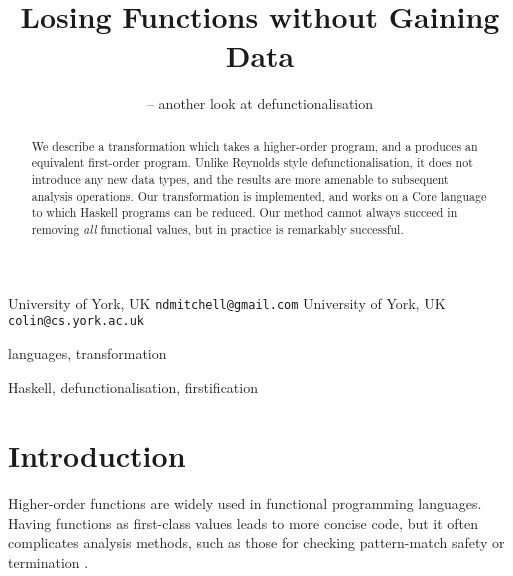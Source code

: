 \documentclass[preprint]{sigplanconf}
\begin{document}
\copyrightdata{[to be supplied]}

\titlebanner{} %
\preprintfooter{}   %

\title{Losing Functions without Gaining Data}
\subtitle{ -- another look at defunctionalisation}

           {University of York, UK}
           {\verb"ndmitchell@gmail.com"}
           {University of York, UK}
           {\verb"colin@cs.york.ac.uk"}

\maketitle

\begin{abstract}
We describe a transformation which takes a higher-order program, and a produces an equivalent first-order program. Unlike Reynolds style defunctionalisation, it does not introduce any new data types, and the results are more amenable to subsequent analysis operations. Our transformation is implemented, and works on a Core language to which Haskell programs can be reduced. Our method cannot always succeed in removing \textit{all} functional values, but in practice is remarkably successful.
\end{abstract}


\terms
languages, transformation

\keywords
Haskell, defunctionalisation, firstification

\section{Introduction}

Higher-order functions are widely used in functional programming languages.  Having functions as first-class values leads to more concise code, but it often complicates analysis methods, such as those for checking pattern-match safety \cite{me:catch} or termination \cite{sereni:higher_order_termination}.
\end{document}
